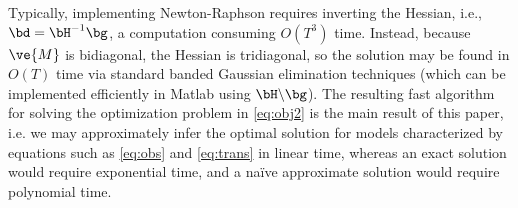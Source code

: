 Typically, implementing Newton-Raphson requires inverting the Hessian, i.e., $\bd = \bH^{-1} \bg$, a computation consuming $O(T^3)$ time. Instead, because $\ve{M}$ is bidiagonal, the Hessian is tridiagonal, so the solution may be found in $O(T)$ time via standard banded Gaussian elimination techniques (which can be implemented efficiently in Matlab using $\bH \backslash \bg$). The resulting fast algorithm for solving the optimization problem in \eqref{eq:obj2} is the main result of this paper, i.e.  we may approximately infer the optimal solution  for models characterized by equations such as \eqref{eq:obs} and \eqref{eq:trans} in linear time, whereas an exact solution would require exponential time, and a na\"{i}ve approximate solution would require polynomial time.  


